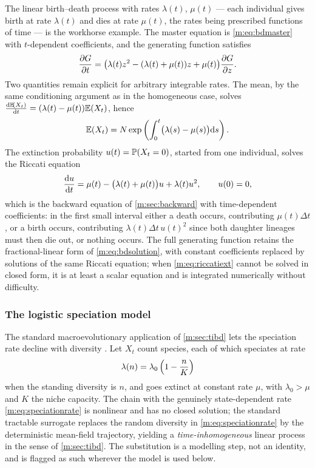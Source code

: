 The linear birth--death process with rates $\lambda(t)$, $\mu(t)$ --- each
individual gives birth at rate $\lambda(t)$ and dies at rate $\mu(t)$, the
rates being prescribed functions of time --- is the workhorse example. The
master equation is \cref{m:eq:bdmaster} with $t$-dependent coefficients, and
the generating function satisfies
\begin{equation}
\label{m:eq:tibdpde}
\frac{\partial G}{\partial t} = \bigl(\lambda(t) z^2 - (\lambda(t)+\mu(t))z + \mu(t)\bigr)\frac{\partial G}{\partial z}.
\end{equation}
Two quantities remain explicit for arbitrary integrable rates. The mean, by the
same conditioning argument as in the homogeneous case, solves
$\frac{\mathrm{d} \mathbb{E}\!\left(X_t\right)}{\mathrm{d} t} = (\lambda(t)-\mu(t))\mathbb{E}\!\left(X_t\right)$, hence
\begin{equation}
\label{m:eq:meanodeinhom}
\mathbb{E}\!\left(X_t\right) = N\exp\left(\int_0^t\bigl(\lambda(s)-\mu(s)\bigr)\mathrm{d} s\right) .
\end{equation}
The extinction probability $u(t)=\mathbb{P}\!\left(X_t=0\right)$, started from one individual,
solves the Riccati equation
\begin{equation}
\label{m:eq:riccatiext}
\frac{\mathrm{d} u}{\mathrm{d} t} = \mu(t) - \bigl(\lambda(t)+\mu(t)\bigr)u + \lambda(t)u^2,
\qquad u(0) = 0 ,
\end{equation}
which is the backward equation of \cref{m:sec:backward} with time-dependent
coefficients: in the first small interval either a death occurs, contributing
$\mu(t)\Delta t$, or a birth occurs, contributing
$\lambda(t)\Delta t\,u(t)^2$ since both daughter lineages must then die out,
or nothing occurs. The full generating function retains the fractional-linear
form of \cref{m:eq:bdsolution}, with constant coefficients replaced by
solutions of the same Riccati equation; when \cref{m:eq:riccatiext} cannot be
solved in closed form, it is at least a scalar equation and is integrated
numerically without difficulty.

\subsubsection{The logistic speciation model}
\label{m:sec:logspec}

The standard macroevolutionary application of \cref{m:sec:tibd} lets the
speciation rate decline with diversity \cite{Allen2010}. Let $X_t$ count
species, each of which speciates at rate
\begin{equation}
\label{m:eq:speciationrate}
\lambda(n) = \lambda_0\left(1-\frac{n}{K}\right)
\end{equation}
when the standing diversity is $n$, and goes extinct at constant rate $\mu$,
with $\lambda_0>\mu$ and $K$ the niche capacity. The chain with the genuinely
state-dependent rate \cref{m:eq:speciationrate} is nonlinear and has no closed
solution; the standard tractable surrogate replaces the random diversity in
\cref{m:eq:speciationrate} by the deterministic mean-field trajectory, yielding
a \emph{time-inhomogeneous} linear process in the sense of \cref{m:sec:tibd}.
The substitution is a modelling step, not an identity, and is flagged as such
wherever the model is used below.

